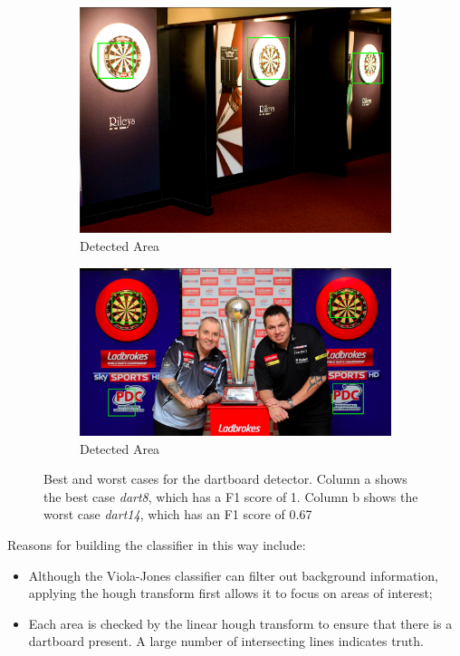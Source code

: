 \documentclass[conference]{IEEEtran}
\begin{document}
\begin{figure}[htb]
\begin{subfigure}{.5\linewidth}
\vspace{0.3cm}
  \centering
  \includegraphics[width=.9\linewidth]{images/task3/bestresult.png}
  \caption{Detected Area}
  \label{fig:sub1}
\end{subfigure}%
\begin{subfigure}{.5\linewidth}
\vspace{1.1cm}
  \centering
  \includegraphics[width=.9\linewidth]{images/task3/worstresult.png}
  \caption{Detected Area}
  \label{fig:sub2}
\end{subfigure}
\caption{Best and worst cases for the dartboard detector. Column a shows the best case \emph{dart8}, which has a F1 score of 1.  Column b shows the worst case \emph{dart14}, which has an F1 score of 0.67}

\end{figure}
Reasons  for building the classifier in this way include: 
\begin{itemize}
\item Although the Viola-Jones classifier can filter out background information, applying the hough transform first allows it to focus on areas of interest; 
\item Each area is checked by the linear hough transform to ensure that there is a dartboard present. A large number of intersecting lines indicates truth. 
\end{itemize}
\end{document}
